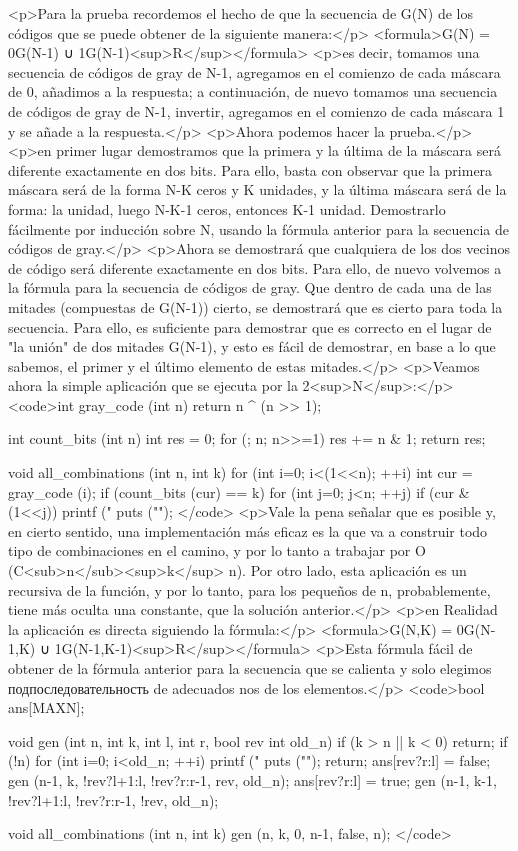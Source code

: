 <p>Para la prueba recordemos el hecho de que la secuencia de G(N) de los códigos que se puede obtener de la siguiente manera:</p>
<formula>G(N) = 0G(N-1) ∪ 1G(N-1)<sup>R</sup></formula>
<p>es decir, tomamos una secuencia de códigos de gray de N-1, agregamos en el comienzo de cada máscara de 0, añadimos a la respuesta; a continuación, de nuevo tomamos una secuencia de códigos de gray de N-1, invertir, agregamos en el comienzo de cada máscara 1 y se añade a la respuesta.</p>
<p>Ahora podemos hacer la prueba.</p>
<p>en primer lugar demostramos que la primera y la última de la máscara será diferente exactamente en dos bits. Para ello, basta con observar que la primera máscara será de la forma N-K ceros y K unidades, y la última máscara será de la forma: la unidad, luego N-K-1 ceros, entonces K-1 unidad. Demostrarlo fácilmente por inducción sobre N, usando la fórmula anterior para la secuencia de códigos de gray.</p>
<p>Ahora se demostrará que cualquiera de los dos vecinos de código será diferente exactamente en dos bits. Para ello, de nuevo volvemos a la fórmula para la secuencia de códigos de gray. Que dentro de cada una de las mitades (compuestas de G(N-1)) cierto, se demostrará que es cierto para toda la secuencia. Para ello, es suficiente para demostrar que es correcto en el lugar de "la unión" de dos mitades G(N-1), y esto es fácil de demostrar, en base a lo que sabemos, el primer y el último elemento de estas mitades.</p>
<p>Veamos ahora la simple aplicación que se ejecuta por la 2<sup>N</sup>:</p>
<code>int gray_code (int n) {
return n ^ (n >> 1);
}

int count_bits (int n) {
int res = 0;
for (; n; n>>=1)
res += n & 1;
return res;
}

void all_combinations (int n, int k) {
for (int i=0; i<(1<<n); ++i) {
int cur = gray_code (i);
if (count_bits (cur) == k) {
for (int j=0; j<n; ++j)
if (cur & (1<<j))
printf ("%
puts ("");
}
}
}</code>
<p>Vale la pena señalar que es posible y, en cierto sentido, una implementación más eficaz es la que va a construir todo tipo de combinaciones en el camino, y por lo tanto a trabajar por O (C<sub>n</sub><sup>k</sup> n). Por otro lado, esta aplicación es un recursiva de la función, y por lo tanto, para los pequeños de n, probablemente, tiene más oculta una constante, que la solución anterior.</p>
<p>en Realidad la aplicación es directa siguiendo la fórmula:</p>
<formula>G(N,K) = 0G(N-1,K) ∪ 1G(N-1,K-1)<sup>R</sup></formula>
<p>Esta fórmula fácil de obtener de la fórmula anterior para la secuencia que se calienta y solo elegimos подпоследовательность de adecuados nos de los elementos.</p>
<code>bool ans[MAXN];

void gen (int n, int k, int l, int r, bool rev int old_n) {
if (k > n || k < 0) return;
if (!n) {
for (int i=0; i<old_n; ++i)
printf ("%
puts ("");
return;
}
ans[rev?r:l] = false;
gen (n-1, k, !rev?l+1:l, !rev?r:r-1, rev, old_n);
ans[rev?r:l] = true;
gen (n-1, k-1, !rev?l+1:l, !rev?r:r-1, !rev, old_n);
}

void all_combinations (int n, int k) {
gen (n, k, 0, n-1, false, n);
}</code>